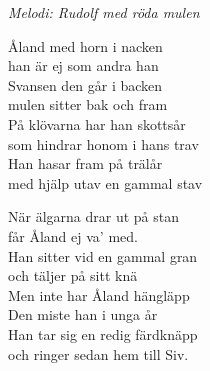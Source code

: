 {\footnotesize\textit{Melodi: Rudolf med röda mulen}} \par
\vspace{10pt}
Åland med horn i nacken\\
han är ej som andra han\\
Svansen den går i backen\\
mulen sitter bak och fram\\
På klövarna har han skottsår\\
som hindrar honom i hans trav\\
Han hasar fram på trälår\\
med hjälp utav en gammal stav\par
\vspace{10pt}
När älgarna drar ut på stan\\
får Åland ej va' med.\\
Han sitter vid en gammal gran\\
och täljer på sitt knä\\
Men inte har Åland hängläpp\\
Den miste han i unga år\\
Han tar sig en redig färdknäpp\\
och ringer sedan hem till Siv.

